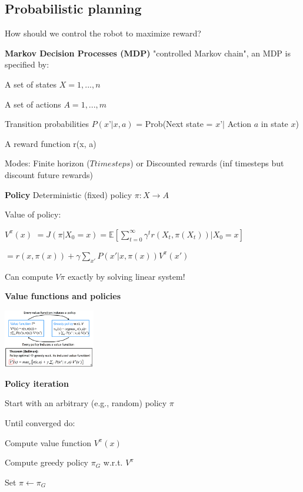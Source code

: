 \documentclass[a4paper, 11pt, landscape]{article}
\begin{document}
\begin{multicols*}{3}
\subsection{Probabilistic planning}
How should we control the robot to maximize reward?

\textbf{Markov Decision Processes (MDP)}
"controlled Markov chain", an MDP is specified by:
\begin{compactitem}
	\item A set of states $X={1,...,n}$
	\item A set of actions $A={1,...,m}$
	\item Transition probabilities $P(x’ | x, a)$ = Prob(Next state = $x’ |$ Action $a$ in state $x$)
	\item A reward function r(x, a)
	
	Modes: Finite horizon ($T timesteps$) or Discounted rewards (inf timesteps but discount future rewards)
\end{compactitem}

\textbf{Policy}
Deterministic (fixed) policy $\pi: X \rightarrow A$

Value of policy: 

$V^\pi(x)$ $= J(\pi | X_0 = x) $$= \mathds{E}[\sum_{t=0}^{\infty} \gamma^t r(X_t, \pi(X_t)) | X_0 = x] $

$= r(x, \pi(x)) + \gamma \sum_{x'} P(x' | x, \pi(x)) V^\pi(x')$

Can compute $V\pi$ exactly by solving linear system! 

\textbf{Value functions and policies}


\includegraphics[width=0.3\textwidth]{img/pai5.png}

\textbf{Policy iteration}
\begin{compactitem}
	\item Start with an arbitrary (e.g., random) policy $\pi$
	\item Until converged do:
	\item Compute value function $V^\pi(x)$
	\item Compute greedy policy $\pi_G$ w.r.t. $V^\pi$
	\item Set $\pi \leftarrow \pi_G$
\end{compactitem}


\end{multicols*}
\end{document}
